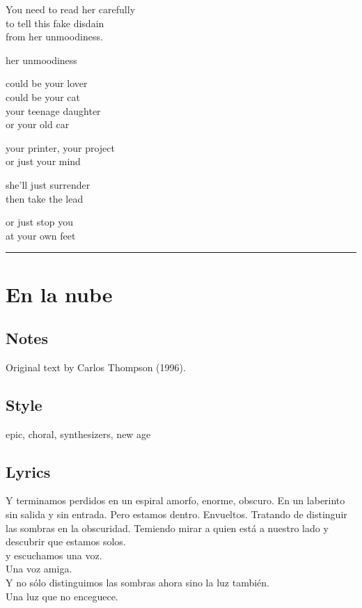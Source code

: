 You need to read her carefully\\
to tell this fake disdain\\
from her unmoodiness.

her unmoodiness

could be your lover\\
could be your cat\\
your teenage daughter\\
or your old car

your printer, your project\\
or just your mind

she'll just surrender\\
then take the lead

or just stop you\\
at your own feet

\begin{center}\rule{0.5\linewidth}{0.5pt}\end{center}

\section{En la nube}\label{en-la-nube}

\subsection{Notes}\label{notes-1}

Original text by Carlos Thompson (1996).

\subsection{Style}\label{style-1}

epic, choral, synthesizers, new age

\subsection{Lyrics}\label{lyrics-1}

Y terminamos perdidos en un espiral amorfo, enorme, obscuro. En un
laberinto sin salida y sin entrada. Pero estamos dentro. Envueltos.
Tratando de distinguir las sombras en la obscuridad. Temiendo mirar a
quien está a nuestro lado y descubrir que estamos solos.\\
y escuchamos una voz.\\
Una voz amiga.\\
Y no sólo distinguimos las sombras ahora sino la luz también.\\
Una luz que no enceguece.

